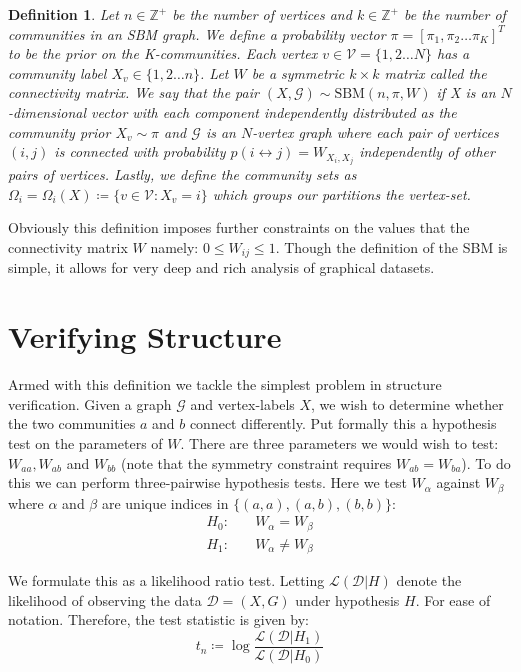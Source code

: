\documentclass[]{article}
\newcommand{\Dcal}{\mathcal{D}}
\newcommand{\Gcal}{\mathcal{G}}
\newcommand{\Vcal}{\mathcal{V}}
\newcommand{\lik}{\mathcal{L}}
\newcommand{\Integers}{\mathbb{Z}}
\newtheorem{definition}{Definition}[section]
\begin{document}
\begin{definition}
	\label{defn:sbm}
	Let $n \in \Integers^+$ be the number of vertices and $k \in \Integers^+$ be the number of communities in an SBM graph. We define a probability vector $\pi = [\pi_1, \pi_2 \dots \pi_K]^T$ to be the prior on the K-communities. Each vertex $v \in \Vcal = \{1, 2 \dots N\}$ has a community label $X_v \in \{1, 2 \dots n\}$. Let $W$ be a symmetric $k \times k$ matrix called the connectivity matrix. We say that the pair $(X, \Gcal) \sim \textrm{SBM}(n, \pi, W)$ if X is an $N$-dimensional vector with each component independently distributed as the community prior $X_v \sim \pi$ and $\Gcal$ is an $N$-vertex graph where each pair of vertices $(i, j)$ is connected with probability $p(i \leftrightarrow j) = W_{X_i, X_j}$ independently of other pairs of vertices. Lastly, we define the community sets as $\Omega_i = \Omega_i(X) \coloneqq \{v \in \Vcal : X_v = i\}$ which groups our partitions the vertex-set.
\end{definition}

Obviously this definition imposes further constraints on the values that the connectivity matrix $W$ namely: $0 \leq W_{ij} \leq 1$. Though the definition of the SBM is simple, it allows for very deep and rich analysis of graphical datasets.

\section{Verifying Structure}

Armed with this definition we tackle the simplest problem in structure verification. Given a graph $\Gcal$ and vertex-labels $X$, we wish to determine whether the two communities $a$ and $b$ connect differently. Put formally this a hypothesis test on the parameters of $W$. There are three parameters we would wish to test: $W_{aa}, W_{ab}$ and $W_{bb}$ (note that the symmetry constraint requires $W_{ab} = W_{ba}$). To do this we can perform three-pairwise hypothesis tests. Here we test $W_{\alpha}$ against $W_{\beta}$ where $\alpha$ and $\beta$ are unique indices in $\{(a,a), (a, b), (b,b)\}$:
%
\begin{equation}
\begin{aligned}
	H_0:& \quad W_{\alpha} = W_{\beta} \\
	H_1:& \quad W_{\alpha} \neq W_{\beta}
\end{aligned}
\end{equation}

We formulate this as a likelihood ratio test. Letting $\lik(\Dcal | H)$ denote the likelihood of observing the data $\Dcal = (X, G)$ under hypothesis $H$. For ease of notation. Therefore, the test statistic is given by:
%
\begin{equation}
	t_n \coloneqq \log \frac{\lik(\Dcal | H_1)}{\lik(\Dcal | H_0)}
	\label{eqn:test-statistic-start}
\end{equation}
\end{document}
